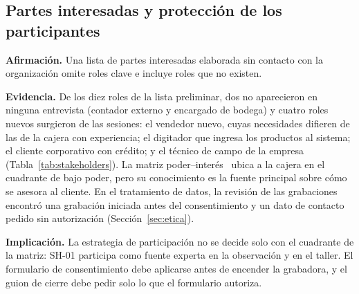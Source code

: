 \subsection{Partes interesadas y protección de los participantes}

\textbf{Afirmación.} Una lista de partes interesadas elaborada sin contacto con la organización omite roles clave e incluye roles que no existen.

\textbf{Evidencia.} De los diez roles de la lista preliminar, dos no aparecieron en ninguna entrevista (contador externo y encargado de bodega) y cuatro roles nuevos surgieron de las sesiones: el vendedor nuevo, cuyas necesidades difieren de las de la cajera con experiencia; el digitador que ingresa los productos al sistema; el cliente corporativo con crédito; y el técnico de campo de la empresa (Tabla~\ref{tab:stakeholders}). La matriz poder--interés~\cite{pmbok2021} ubica a la cajera en el cuadrante de bajo poder, pero su conocimiento es la fuente principal sobre cómo se asesora al cliente. En el tratamiento de datos, la revisión de las grabaciones encontró una grabación iniciada antes del consentimiento y un dato de contacto pedido sin autorización (Sección~\ref{sec:etica}).

\textbf{Implicación.} La estrategia de participación no se decide solo con el cuadrante de la matriz: SH-01 participa como fuente experta en la observación y en el taller. El formulario de consentimiento debe aplicarse antes de encender la grabadora, y el guion de cierre debe pedir solo lo que el formulario autoriza.
